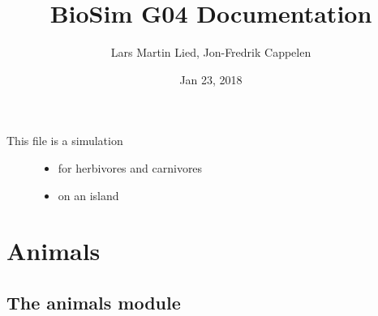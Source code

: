 \documentclass[a4paper,10pt,english]{sphinxmanual}
\title{BioSim G04 Documentation}
\date{Jan 23, 2018}
\author{Lars Martin Lied, Jon-Fredrik Cappelen}
\begin{document}
\maketitle
\sphinxtableofcontents
{}\label{\detokenize{index::doc}}

\begin{description}
\item[{This file is a simulation}] \leavevmode\begin{itemize}
\item {} 
for herbivores and carnivores

\item {} 
on an island

\end{itemize}

\end{description}


\chapter{Animals}
\label{\detokenize{animals:animals}}\label{\detokenize{animals::doc}}\label{\detokenize{animals:welcome-to-biosim-g04-s-documentation}}

\section{The animals module}
\label{\detokenize{animals:the-animals-module}}\label{\detokenize{animals:module-biosim.animals}}
\end{document}
